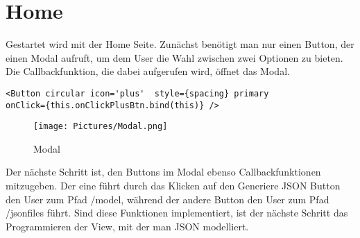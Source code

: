\documentclass[a4paper,11pt]{scrreprt}
\begin{document}
\section{Home}
Gestartet wird mit der Home Seite. Zunächst benötigt man nur einen Button, der einen Modal aufruft, um dem User die Wahl zwischen zwei Optionen zu bieten. Die Callbackfunktion, die dabei aufgerufen wird, öffnet das Modal. 
\begin{lstlisting}
<Button circular icon='plus'  style={spacing} primary
onClick={this.onClickPlusBtn.bind(this)} />
\end{lstlisting}
\begin{figure}[ht]
\centering
\texttt{[image: Pictures/Modal.png]}
\caption{Modal}
\label{Modal}
\end{figure}
\hfill \break
Der nächste Schritt ist, den Buttons im Modal ebenso Callbackfunktionen mitzugeben. Der eine führt durch das Klicken auf den Generiere JSON Button den User zum Pfad /model, während der andere Button den User zum Pfad /jsonfiles führt. Sind diese Funktionen implementiert, ist der nächste Schritt das Programmieren der View, mit der man JSON modelliert. 
\hfill \break
\hfill \break
\hfill \break
\hfill \break
\end{document}
